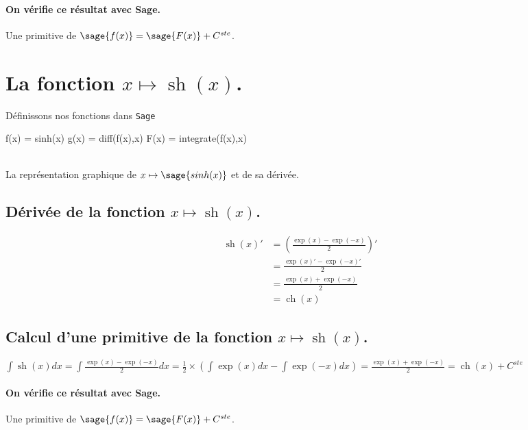 \documentclass[a4paper,12pt]{report}
\renewcommand{\sinh}{\mathop{\mathrm{sh}}}
\renewcommand{\cosh}{\mathop{\mathrm{ch}}}
\begin{document}
\paragraph{On vérifie ce résultat avec Sage.}
Une primitive de $\sage{f(x)} = \sage{F(x)} + C^{ste}$.





\section{La fonction  $x \mapsto \sinh(x)$.}
Définissons nos fonctions dans {\texttt{Sage}}
\begin{sageblock}
    f(x) = sinh(x)
    g(x) = diff(f(x),x)
    F(x) = integrate(f(x),x)
\end{sageblock}

\begin{center}
 \\
La représentation graphique de $x \mapsto \sage{sinh(x)} $ et de sa dérivée. 
\end{center}


\subsection{Dérivée de la fonction $x \mapsto \sinh(x)$.}
\begin{align*}
\sinh(x)' & = \left( \frac{\exp(x)-\exp(-x)}{2} \right)' \\ 
& = \frac{\exp(x)'-\exp(-x)'}{2} \\
& = \frac{\exp(x)+\exp(-x)}{2} \\
& = \cosh(x)
\end{align*}


\subsection{Calcul d'une primitive de la fonction  $x \mapsto \sinh(x)$.}
$\int \sinh(x) dx = \int \frac{\exp(x)- \exp(-x)}{2} dx = \frac{1}{2} \times \left( \int \exp(x) dx - \int \exp(-x) dx \right) = \frac{ \exp(x) + \exp(-x) }{2} = \cosh(x) + C^{ste}$
\paragraph{On vérifie ce résultat avec Sage.}
Une primitive de $\sage{f(x)} = \sage{F(x)} + C^{ste}$.
\end{document}
